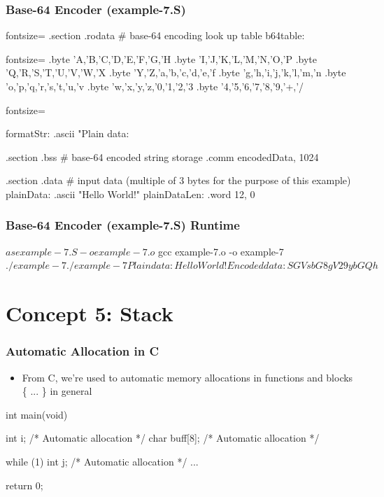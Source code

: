 \documentclass[11pt,xcolor=dvipsnames]{beamer}
\newcommand{\mvs}{\vspace{-0.95em}}
\begin{document}
\begin{frame}[fragile,t]
\frametitle{Base-64 Encoder (example-7.S)}
\mvs
\begin{gascode*}{fontsize=\fontsize{9}{8}}
.section .rodata
  # base-64 encoding look up table
  b64table:
\end{gascode*}
\begin{textcode*}{fontsize=\fontsize{9}{8}}
  .byte 'A,'B,'C,'D,'E,'F,'G,'H
  .byte 'I,'J,'K,'L,'M,'N,'O,'P
  .byte 'Q,'R,'S,'T,'U,'V,'W,'X
  .byte 'Y,'Z,'a,'b,'c,'d,'e,'f
  .byte 'g,'h,'i,'j,'k,'l,'m,'n
  .byte 'o,'p,'q,'r,'s,'t,'u,'v
  .byte 'w,'x,'y,'z,'0,'1,'2,'3
  .byte '4,'5,'6,'7,'8,'9,'+,'/
\end{textcode*}
\begin{gascode*}{fontsize=\fontsize{9}{8}}

formatStr:
  .ascii "Plain data: %

.section .bss
  # base-64 encoded string storage
  .comm encodedData, 1024

.section .data
  # input data (multiple of 3 bytes for the purpose of this example)
  plainData:      .ascii "Hello World!\0"
  plainDataLen:   .word 12, 0
\end{gascode*}
\end{frame}

\begin{frame}[fragile,t]
\frametitle{Base-64 Encoder (example-7.S) Runtime}
\mvs
\begin{textcode}
$ as example-7.S -o example-7.o
$ gcc example-7.o -o example-7
$ ./example-7
./example-7
Plain data: Hello World!
Encoded data: SGVsbG8gV29ybGQh
$
\end{textcode}
\end{frame}

\section{Concept 5: Stack}

\begin{frame}[fragile,t]
\frametitle{Automatic Allocation in C}
\begin{itemize}
  \item From C, we're used to automatic memory allocations in functions and blocks \{ ... \} in general
\end{itemize}
\begin{ccode}
int main(void) {
  int i;            /* Automatic allocation */
  char buff[8];     /* Automatic allocation */

  while (1) {
    int j;          /* Automatic allocation */
    ...
  }

  return 0;
}
\end{ccode}
\end{frame}
\end{document}
